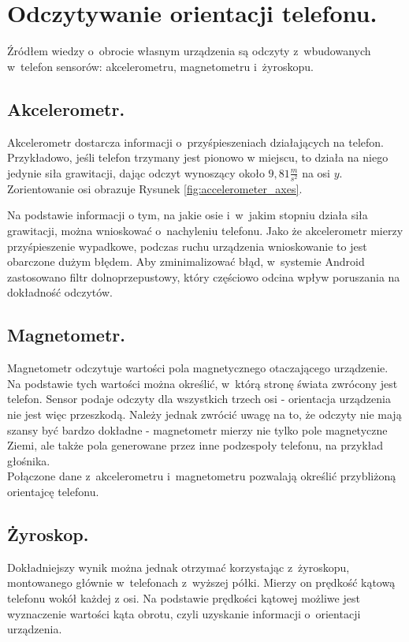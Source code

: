 \documentclass[a4paper,twocolumn,11pt]{article}
\begin{document}

\section{Odczytywanie orientacji telefonu.} \label{sec:orientation_tracking}

Źródłem wiedzy o~obrocie własnym urządzenia są odczyty z~wbudowanych w~telefon sensorów: akcelerometru, magnetometru i~żyroskopu.


\subsection{Akcelerometr.}
 Akcelerometr dostarcza informacji o~przyśpieszeniach działających na telefon.
 Przykładowo, jeśli telefon trzymany jest pionowo w miejscu, to działa na niego jedynie siła grawitacji, dając odczyt wynoszący około $9,81\frac{m}{s^2}$ na osi $y$.
 Zorientowanie osi obrazuje Rysunek \ref{fig:accelerometer_axes}.
 
 

 Na podstawie informacji o tym, na jakie osie i~w~jakim stopniu działa siła grawitacji, można wnioskować o~nachyleniu telefonu.
 Jako że akcelerometr mierzy przyśpieszenie wypadkowe, podczas ruchu urządzenia wnioskowanie to jest obarczone dużym błędem.
 Aby zminimalizować błąd, w~systemie Android zastosowano filtr dolnoprzepustowy, który częściowo odcina wpływ poruszania na dokładność odczytów.


\subsection{Magnetometr.}
 Magnetometr odczytuje wartości pola magnetycznego otaczającego urządzenie.
 Na podstawie tych wartości można określić, w~którą stronę świata zwrócony jest telefon.
 Sensor podaje odczyty dla wszystkich trzech osi - orientacja urządzenia nie jest więc przeszkodą.
 Należy jednak zwrócić uwagę na to, że odczyty nie mają szansy być bardzo dokładne - magnetometr mierzy nie tylko pole magnetyczne Ziemi, ale także pola generowane przez inne podzespoły telefonu, na przykład głośnika.\\


Połączone dane z~akcelerometru i~magnetometru pozwalają określić przybliżoną orientajcę telefonu.


\subsection{Żyroskop.}
 Dokładniejszy wynik można jednak otrzymać korzystając z~żyroskopu, montowanego głównie w~telefonach z~wyższej półki.
 Mierzy on prędkość kątową telefonu wokół każdej z osi.
 Na podstawie prędkości kątowej możliwe jest wyznaczenie wartości kąta obrotu, czyli uzyskanie informacji o~orientacji urządzenia.
\end{document}
